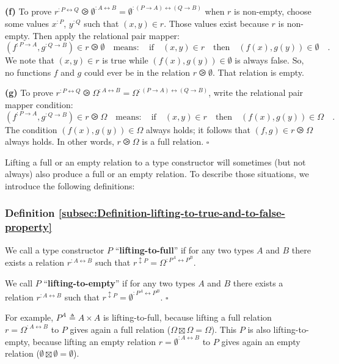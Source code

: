 \textbf{(f)} To prove $r^{:P\leftrightarrow Q}\ogreaterthan\emptyset^{:A\leftrightarrow B}=\emptyset^{:(P\rightarrow A)\leftrightarrow(Q\rightarrow B)}$
when $r$ is non-empty, choose some values $x^{:P}$, $y^{:Q}$ such
that $(x,y)\in r$. Those values exist because $r$ is non-empty.
Then apply the relational pair mapper:
\[
(f^{:P\rightarrow A},g^{:Q\rightarrow B})\in r\ogreaterthan\emptyset\quad\text{means}:\quad\text{if}\quad(x,y)\in r\quad\text{then}\quad(f(x),g(y))\in\emptyset\quad.
\]
We note that $(x,y)\in r$ is true while $(f(x),g(y))\in\emptyset$
is always false. So, no functions $f$ and $g$ could ever be in the
relation $r\ogreaterthan\emptyset$. That relation is empty.

\textbf{(g)} To prove $r^{:P\leftrightarrow Q}\ogreaterthan\Omega^{:A\leftrightarrow B}=\Omega^{:(P\rightarrow A)\leftrightarrow(Q\rightarrow B)}$,
write the relational pair mapper condition:
\[
(f^{:P\rightarrow A},g^{:Q\rightarrow B})\in r\ogreaterthan\Omega\quad\text{means}:\quad\text{if}\quad(x,y)\in r\quad\text{then}\quad(f(x),g(y))\in\Omega\quad.
\]
The condition $(f(x),g(y))\in\Omega$ always holds; it follows that
$(f,g)\in r\ogreaterthan\Omega$ always holds. In other words, $r\ogreaterthan\Omega$
is a full relation. $\square$

Lifting a full or an empty relation to a type constructor will sometimes
(but not always) also produce a full or an empty relation. To describe
those situations, we introduce the following definitions:

\subsubsection{Definition \label{subsec:Definition-lifting-to-true-and-to-false-property}\ref{subsec:Definition-lifting-to-true-and-to-false-property}}

We call a type constructor $P$ \textsf{``}\textbf{lifting-to-full}\textsf{''}
if for any two types $A$ and $B$  there exists a relation $r^{:A\leftrightarrow B}$
such that $r^{\updownarrow P}=\Omega^{:P^{A}\leftrightarrow P^{B}}$.

We call $P$ \textsf{``}\textbf{lifting-to-empty}\textsf{''}
if for any two types $A$ and $B$ there exists a relation $r^{:A\leftrightarrow B}$
such that $r^{\updownarrow P}=\emptyset^{:P^{A}\leftrightarrow P^{B}}$.
$\square$

For example, $P^{A}\triangleq A\times A$ is lifting-to-full, because
lifting a full relation $r=\Omega^{:A\leftrightarrow B}$ to $P$
gives again a full relation ($\Omega\boxtimes\Omega=\Omega$). This
$P$ is also lifting-to-empty, because lifting an empty relation $r=\emptyset^{:A\leftrightarrow B}$
to $P$ gives again an empty relation ($\emptyset\boxtimes\emptyset=\emptyset$). 

